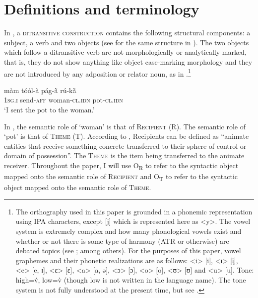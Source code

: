 \documentclass[output=paper]{langsci/langscibook}
\begin{document}
\section{Definitions and terminology}\label{§2:definitions.pacchiarotti}

In , a \textsc{ditransitive construction} contains the following structural components: a subject, a verb and two objects (see \citealt{olawsky1999} for the same structure in ). The two objects which follow a ditransitive verb are not morphologically or analytically marked, that is, they do not show anything like object case-marking morphology and they are not introduced by any adposition or relator noun, as in .\footnote{The  orthography used in this paper is grounded in a phonemic representation using IPA characters, except [j] which is represented here as {\textless}y>. The vowel system is extremely complex and how many phonological vowels exist and whether or not there is some type of harmony (ATR or otherwise) are debated topics (see \citealt{peterson1971,canu1974,rennison1990,nikiema2000,calamaibertinetto2005}; among others). For the purposes of this paper, vowel graphemes and their phonetic realizations are as follows: {\textless}i> [i], {\textless}ɪ> [i̙], {\textless}e> [e, ɪ], {\textless}ɛ> [ɛ], {\textless}a> [a, ə], {\textless}ɔ> [ɔ], {\textless}o> [o], {\textless}ʊ> [ʊ] and {\textless}u> [u]. Tone: high=\'{v}, low=\`{v} (though low is not written in the language name). The tone system is not fully understood at the present time, but see \citet{peterson1971}.}

\ea
\label{ex:pacchiarotti:1}
\gll màm    tóól-à        pág-\`{ã}             rú-k\`{ã}\\
\textsc{1sg.i}    send-\textsc{aff}      woman-\textsc{cl.idn}       pot-\textsc{cl.idn} \\
\glt `I sent the pot to the woman.'  
\z

In , the semantic role of `woman' is that of \textsc{Recipient} (R).  The semantic role of `pot' is that of \textsc{Theme} (T). According to \citet[274]{kittila2005}, Recipients can be defined as ``animate entities that receive something concrete transferred to their sphere of control or domain of possession''. The \textsc{Theme} is the item being transferred to the animate receiver. Throughout the paper, I will use O\textsubscript{R} to refer to the syntactic object mapped onto the semantic role of \textsc{Recipient} and O\textsubscript{T} to refer to the syntactic object mapped onto the semantic role of \textsc{Theme}. 
\end{document}
